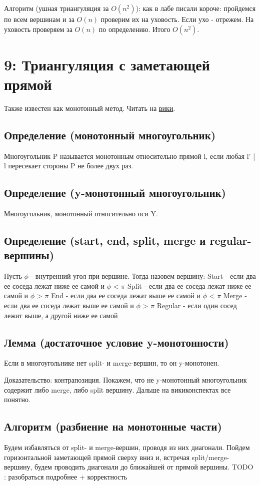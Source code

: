 \documentclass[11pt]{article}
\begin{document}
Алгоритм (ушная триангуляция за \(O(n^2)\)): как в лабе писали
короче: пройдемся по всем вершинам и за \(O(n)\) проверим их на
уховость. Если ухо - отрежем.  На уховость проверяем за \(O(n)\) по
определению. Итого \(O(n^2)\).
\section{{\bfseries{}} 9:  Триангуляция с заметающей прямой}
\label{sec:orgheadline39}
Также известен как монотонный метод. Читать на \href{http://neerc.ifmo.ru/wiki/index.php?title=Триангуляция_полигонов_(ушная_\%2B_монотонная)#.D0.9C.D0.BE.D0.BD.D0.BE.D1.82.D0.BE.D0.BD.D0.BD.D1.8B.D0.B9_.D0.BC.D0.B5.D1.82.D0.BE.D0.B4}{вики}.

\subsection{Определение (монотонный многоугольник)}
\label{sec:orgheadline33}
Многоугольник P называется монотонным относительно прямой l, если любая l' \uline{|} l пересекает стороны P
не более двух раз.
\subsection{Определение (y-монотонный многоугольник)}
\label{sec:orgheadline34}
Многоугольник, монотонный относительно оси Y.
\subsection{Определение (start, end, split, merge и regular-вершины)}
\label{sec:orgheadline35}
Пусть \(\phi\) - внутренний угол при вершине. Тогда назовем вершину:
Start - если два ее соседа лежат ниже ее самой и \(\phi\) < \(\pi\)
Split - если два ее соседа лежат ниже ее самой и \(\phi\) > \(\pi\)
End - если два ее соседа лежат выше ее самой и \(\phi\) < \(\pi\)
Merge - если два ее соседа лежат выше ее самой и \(\phi\) > \(\pi\)
Regular - если один сосед лежит выше, а другой ниже ее самой
\subsection{Лемма (достаточное условие y-монотонности)}
\label{sec:orgheadline36}
Если в многоугольнике нет split- и merge-вершин, то он y-монотонен.

Доказательство: контрапозиция. Покажем, что не y-монотонный многоугольник содержит либо merge, либо split вершину.
Дальше на викиконспектах все понятно.
\subsection{Алгоритм (разбиение на монотонные части)}
\label{sec:orgheadline37}
Будем избавляться от split- и merge-вершин, проводя из них диагонали.
Пойдем горизонтальной заметающей прямой сверху вниз и, встречая split/merge-вершину, будем проводить диагонали до ближайшей от прямой вершины.
TODO : разобраться подробнее + корректность
\end{document}
